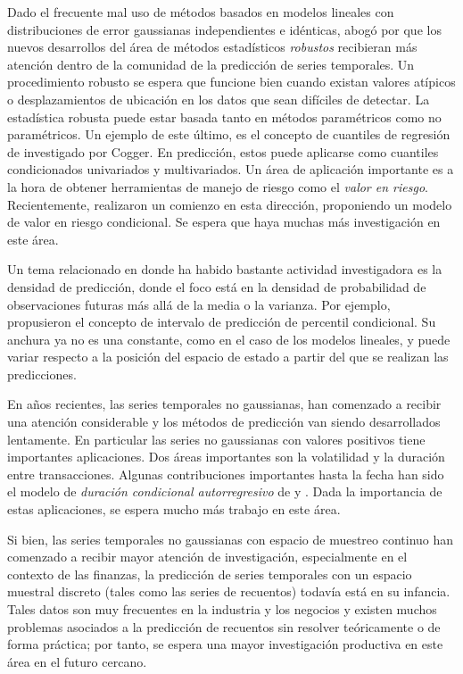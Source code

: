 \documentclass{llncs}
\begin{document}
Dado el frecuente mal uso de métodos basados en modelos lineales con distribuciones de error gaussianas independientes e idénticas, \cite{Cogger1988403} abogó por que los nuevos desarrollos del área de métodos estadísticos \emph{robustos} recibieran más atención dentro de la comunidad de la predicción de series temporales. Un procedimiento robusto se espera que funcione bien cuando existan valores atípicos o desplazamientos de ubicación en los datos que sean difíciles de detectar. La estadística robusta puede estar basada tanto en métodos paramétricos como no paramétricos. Un ejemplo de este último, es el concepto de cuantiles de regresión de \cite{Koenker197833} investigado por Cogger. En predicción, estos puede aplicarse como cuantiles condicionados univariados y multivariados. Un área de aplicación importante es a la hora de obtener herramientas de manejo de riesgo como el \emph{valor en riesgo}. Recientemente, \cite{Engle2004367} realizaron un comienzo en esta dirección, proponiendo un modelo de valor en riesgo condicional. Se espera que haya muchas más investigación en este área.

Un tema relacionado en donde ha habido bastante actividad investigadora es la densidad de predicción, donde el foco está en la densidad de probabilidad de observaciones futuras más allá de la media o la varianza. Por ejemplo, \cite{Yao1995395} propusieron el concepto de intervalo de predicción de percentil condicional. Su anchura ya no es una constante, como en el caso de los modelos lineales, y puede variar respecto a la posición del espacio de estado a partir del que se realizan las predicciones.

En años recientes, las series temporales no gaussianas, han comenzado a recibir una atención considerable y los métodos de predicción van siendo desarrollados lentamente. En particular las series no gaussianas con valores positivos tiene importantes aplicaciones. Dos áreas importantes son la volatilidad y la duración entre transacciones. Algunas contribuciones importantes hasta la fecha han sido el modelo de \emph{duración condicional autorregresivo} de \cite{Engle19981127} y  \cite{Andersen2003579}. Dada la importancia de estas aplicaciones, se espera mucho más trabajo en este área.

Si bien, las series temporales no gaussianas con espacio de muestreo continuo han comenzado a recibir mayor atención de investigación, especialmente en el contexto de las  finanzas, la predicción de series temporales con un espacio muestral discreto (tales como las series de recuentos) todavía está en su infancia. Tales datos son muy frecuentes en la industria y los negocios y existen muchos problemas asociados a la predicción de recuentos sin resolver teóricamente o de forma práctica; por tanto, se espera una mayor investigación productiva en este área en el futuro cercano.
\end{document}
